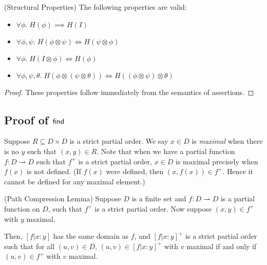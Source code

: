 \begin{lemma}{(Structural Properties)}
The following properties are valid:
\begin{itemize}
\item $\forall \phi.\;H(\phi) \implies H(I)$
\item $\forall \phi,\psi.\;H(\phi \otimes \psi) \iff H(\psi \otimes \phi)$
\item $\forall \phi.\;H(I \otimes \phi) \iff H(\phi)$
\item $\forall \phi,\psi,\theta.\;H(\phi \otimes (\psi \otimes \theta)) \iff H((\phi \otimes \psi) \otimes \theta)$
\end{itemize}
\end{lemma}
\begin{proof}
These properties follow immediately from the semantics of assertions. 
\end{proof}

\subsection{Proof of $\mathsf{find}$}

Suppose $R \subseteq D \times D$ is a strict partial order. We say $x
\in D$ is \emph{maximal} when there is no $y$ such that $(x,y) \in R$.
Note that when we have a partial function $f : D \rightharpoonup D$
such that $f^+$ is a strict partial order, $x \in D$ is maximal
precisely when $f(x)$ is not defined. (If $f(x)$ were defined, then
$(x, f(x)) \in f^+$. Hence it cannot be defined for any maximal
element.)

\begin{lemma}{(Path Compression Lemma)}
  Suppose $D$ is a finite set and $f : D \rightharpoonup D$ is a
  partial function on $D$, such that $f^{+}$ is a strict partial
  order. Now suppose $(x,y) \in f^{+}$ with $y$ maximal.

Then, $[f|x:y]$ has the same domain as $f$, and $[f|x:y]^+$ is a
strict partial order such that for all $(u,v) \in D$, $(u,v) \in
[f|x:y]^{+}$ with $v$ maximal if and only if $(u,v) \in f^{+}$ with
$v$ maximal.
\end{lemma}

